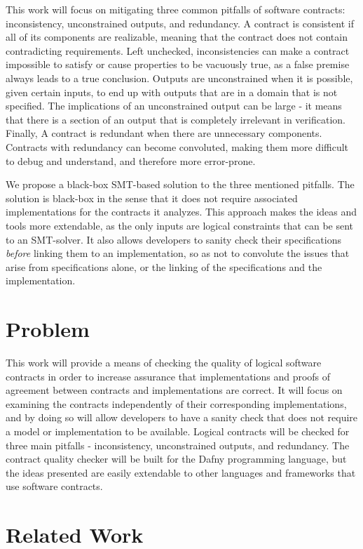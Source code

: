 \documentclass{article}
\begin{document}
This work will focus on mitigating three common pitfalls of software contracts: inconsistency, unconstrained
outputs, and redundancy. A contract is consistent if all of its components are realizable, meaning that the contract
does not contain contradicting requirements. Left unchecked, inconsistencies can make a contract impossible to satisfy
or cause properties to be vacuously true, as a false premise always leads to a true conclusion. Outputs are
unconstrained when it is possible, given certain inputs, to end up with outputs that are in a domain that is not specified.
The implications of an unconstrained output can be large - it means that there is a section of an output that is
completely irrelevant in verification. Finally, A contract is redundant when there are unnecessary components. Contracts
with redundancy can become convoluted, making them more difficult to debug and understand, and therefore more
error-prone.

We propose a black-box SMT-based solution to the three mentioned pitfalls. The solution is black-box in the sense
that it does not require associated implementations for the contracts it analyzes. This approach makes the ideas and tools
more extendable, as the only inputs are logical constraints that can be sent to an SMT-solver. It also allows developers
to sanity check their specifications {\it before} linking them to an implementation, so as not to convolute the issues
that arise from specifications alone, or the linking of the specifications and the implementation.

\section{Problem}

This work will provide a means of checking the quality of logical software contracts in order to increase assurance
that implementations and proofs of agreement between contracts and implementations are correct. It will focus on
examining the contracts independently of their corresponding implementations, and by doing so will allow developers
to have a sanity check that does not require a model or implementation to be available. Logical contracts will be
checked for three main pitfalls - inconsistency, unconstrained outputs, and redundancy. The contract quality checker
will be built for the Dafny programming language, but the ideas presented are easily extendable to other languages
and frameworks that use software contracts.

\section{Related Work}
\end{document}
